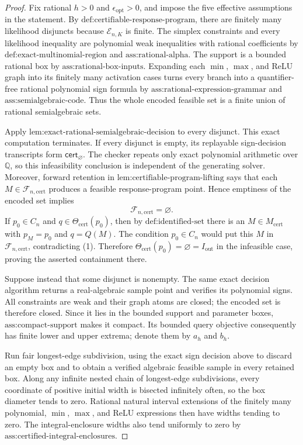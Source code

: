 \documentclass{article}
\begin{document}
\begin{proof}
Fix rational \(h>0\) and \(\epsilon_{\mathrm{opt}}>0\), and impose the five effective assumptions in the statement.  By \(\text{def:certifiable-response-program}\), there are finitely many likelihood disjuncts because \(\mathcal E_{n,K}\) is finite.  The simplex constraints and every likelihood inequality are polynomial weak inequalities with rational coefficients by \(\text{def:exact-multinomial-region}\) and \(\text{ass:rational-alpha}\).  The support is a bounded rational box by \(\text{ass:rational-box-inputs}\).  Expanding each \(\min\), \(\max\), and ReLU graph into its finitely many activation cases turns every branch into a quantifier-free rational polynomial sign formula by \(\text{ass:rational-expression-grammar}\) and \(\text{ass:semialgebraic-code}\).  Thus the whole encoded feasible set is a finite union of rational semialgebraic sets.

Apply \(\text{lem:exact-rational-semialgebraic-decision}\) to every disjunct.  This exact computation terminates.  If every disjunct is empty, its replayable sign-decision transcripts form \(\mathsf{cert}_{\varnothing}\).  The checker repeats only exact polynomial arithmetic over \(\mathbb Q\), so this infeasibility conclusion is independent of the generating solver.  Moreover, forward retention in \(\text{lem:certifiable-program-lifting}\) says that each \(M\in\mathcal F_{n,\mathrm{cert}}\) produces a feasible response-program point.  Hence emptiness of the encoded set implies
\[
\mathcal F_{n,\mathrm{cert}}=\varnothing. \tag{1}
\]
If \(p_0\in C_n\) and \(q\in\Theta_{\mathrm{cert}}(p_0)\), then by \(\text{def:identified-set}\) there is an \(M\in M_{\mathrm{cert}}\) with \(p_M=p_0\) and \(q=Q(M)\).  The condition \(p_0\in C_n\) would put this \(M\) in \(\mathcal F_{n,\mathrm{cert}}\), contradicting (1).  Therefore \(\Theta_{\mathrm{cert}}(p_0)=\varnothing=I_{\mathrm{out}}\) in the infeasible case, proving the asserted containment there.

Suppose instead that some disjunct is nonempty.  The same exact decision algorithm returns a real-algebraic sample point and verifies its polynomial signs.  All constraints are weak and their graph atoms are closed; the encoded set is therefore closed.  Since it lies in the bounded support and parameter boxes, \(\text{ass:compact-support}\) makes it compact.  Its bounded query objective consequently has finite lower and upper extrema; denote them by \(a_h\) and \(b_h\).

Run fair longest-edge subdivision, using the exact sign decision above to discard an empty box and to obtain a verified algebraic feasible sample in every retained box.  Along any infinite nested chain of longest-edge subdivisions, every coordinate of positive initial width is bisected infinitely often, so the box diameter tends to zero.  Rational natural interval extensions of the finitely many polynomial, \(\min\), \(\max\), and ReLU expressions then have widths tending to zero.  The integral-enclosure widths also tend uniformly to zero by \(\text{ass:certified-integral-enclosures}\).


\end{proof}
\end{document}
